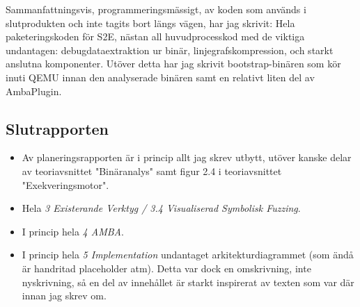 Sammanfattningsvis, programmeringsmässigt, av koden som används i slutprodukten och inte tagits bort
längs vägen, har jag skrivit: Hela paketeringskoden för S2E, nästan all huvudprocesskod med de
viktiga undantagen: debugdataextraktion ur binär, linjegrafskompression, och starkt anslutna
komponenter. Utöver detta har jag skrivit bootstrap-binären som kör inuti QEMU innan den analyserade
binären samt en relativt liten del av AmbaPlugin.

\subsection*{Slutrapporten}

\begin{itemize}

	\item Av planeringsrapporten är i princip allt jag skrev utbytt, utöver kanske delar av
	      teoriavsnittet "Binäranalys" samt figur 2.4 i teoriavsnittet "Exekveringsmotor".

	\item Hela \textit{3 Existerande Verktyg / 3.4 Visualiserad Symbolisk Fuzzing}.

	\item I princip hela \textit{4 AMBA}.

	\item I princip hela \textit{5 Implementation} undantaget arkitekturdiagrammet (som ändå är
	      handritad placeholder atm). Detta var dock en omskrivning, inte nyskrivning, så en del av
	      innehållet är starkt inspirerat av texten som var där innan jag skrev om.

\end{itemize}
